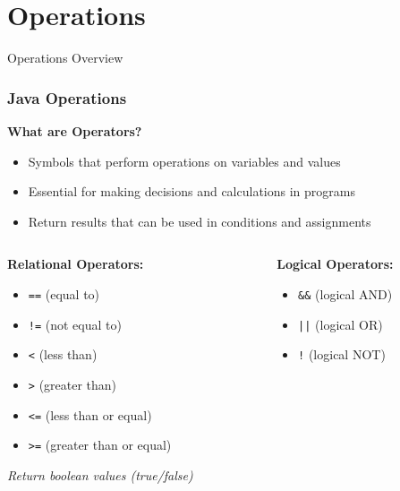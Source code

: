 \documentclass[aspectratio=169]{beamer}
\begin{document}
\section{Operations}

\begin{frame}{Operations Overview}
    \frametitle{Java Operations}
    
    \textbf{What are Operators?}
    \begin{itemize}
        \item Symbols that perform operations on variables and values
        \item Essential for making decisions and calculations in programs
        \item Return results that can be used in conditions and assignments
    \end{itemize}
    
    \vspace{0.3em}
    
    \begin{columns}[t]
        \begin{column}{0.5\textwidth}
            \textbf{Relational Operators:}
            \begin{itemize}
                \item \texttt{==} (equal to)
                \item \texttt{!=} (not equal to)
                \item \texttt{<} (less than)
                \item \texttt{>} (greater than)
                \item \texttt{<=} (less than or equal)
                \item \texttt{>=} (greater than or equal)
            \end{itemize}
            \small \textit{Return boolean values (true/false)}
        \end{column}
        
        \begin{column}{0.5\textwidth}
            \textbf{Logical Operators:}
            \begin{itemize}
                \item \texttt{\&\&} (logical AND)
                \item \texttt{||} (logical OR)
                \item \texttt{!} (logical NOT)
            \end{itemize}
            

\end{column}
\end{columns}
\end{frame}
\end{document}
